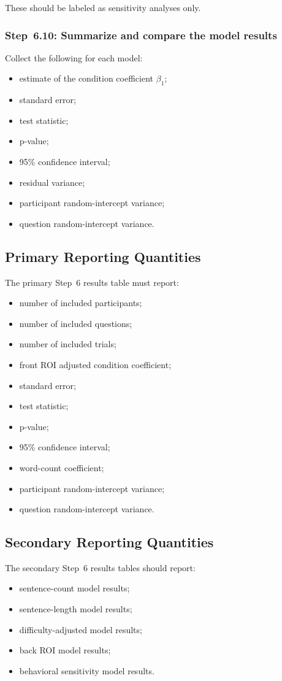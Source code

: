 \documentclass[11pt]{article}
\begin{document}
These should be labeled as sensitivity analyses only.

\subsubsection{Step~6.10: Summarize and compare the model results}
Collect the following for each model:
\begin{itemize}
    \item estimate of the condition coefficient \(\beta_1\);
    \item standard error;
    \item test statistic;
    \item p-value;
    \item 95\% confidence interval;
    \item residual variance;
    \item participant random-intercept variance;
    \item question random-intercept variance.
\end{itemize}

\subsection{Primary Reporting Quantities}
The primary Step~6 results table must report:
\begin{itemize}
    \item number of included participants;
    \item number of included questions;
    \item number of included trials;
    \item front ROI adjusted condition coefficient;
    \item standard error;
    \item test statistic;
    \item p-value;
    \item 95\% confidence interval;
    \item word-count coefficient;
    \item participant random-intercept variance;
    \item question random-intercept variance.
\end{itemize}

\subsection{Secondary Reporting Quantities}
The secondary Step~6 results tables should report:
\begin{itemize}
    \item sentence-count model results;
    \item sentence-length model results;
    \item difficulty-adjusted model results;
    \item back ROI model results;
    \item behavioral sensitivity model results.
\end{itemize}
\end{document}
